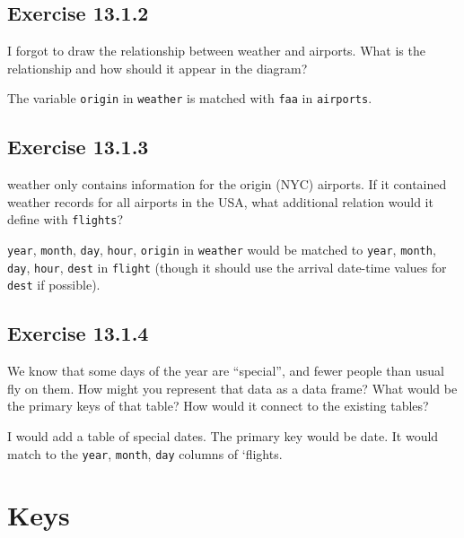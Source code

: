 \documentclass[]{book}
\theoremstyle{plain}
\theoremstyle{remark}
\theoremstyle{definition}
\theoremstyle{definition}
\theoremstyle{definition}
\theoremstyle{remark}
\begin{document}
\hypertarget{exercise-13.1.2}{%
\subsection*{\texorpdfstring{Exercise
{13.1.2}}{Exercise 13.1.2}}\label{exercise-13.1.2}}

I forgot to draw the relationship between weather and airports. What is
the relationship and how should it appear in the diagram?

The variable \texttt{origin} in \texttt{weather} is matched with
\texttt{faa} in \texttt{airports}.

\hypertarget{exercise-13.1.3}{%
\subsection*{\texorpdfstring{Exercise
{13.1.3}}{Exercise 13.1.3}}\label{exercise-13.1.3}}

weather only contains information for the origin (NYC) airports. If it
contained weather records for all airports in the USA, what additional
relation would it define with \texttt{flights}?

\texttt{year}, \texttt{month}, \texttt{day}, \texttt{hour},
\texttt{origin} in \texttt{weather} would be matched to \texttt{year},
\texttt{month}, \texttt{day}, \texttt{hour}, \texttt{dest} in
\texttt{flight} (though it should use the arrival date-time values for
\texttt{dest} if possible).

\hypertarget{exercise-13.1.4}{%
\subsection*{\texorpdfstring{Exercise
{13.1.4}}{Exercise 13.1.4}}\label{exercise-13.1.4}}

We know that some days of the year are ``special'', and fewer people
than usual fly on them. How might you represent that data as a data
frame? What would be the primary keys of that table? How would it
connect to the existing tables?

I would add a table of special dates. The primary key would be date. It
would match to the \texttt{year}, \texttt{month}, \texttt{day} columns
of `flights.

\hypertarget{keys}{%
\section{Keys}\label{keys}}
\end{document}
